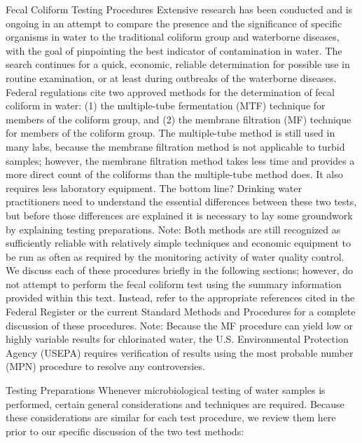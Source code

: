 \documentclass{article}
\begin{document}
Fecal Coliform Testing Procedures Extensive research has been conducted
and is ongoing in an attempt to compare the presence and the
significance of specific organisms in water to the traditional coliform
group and waterborne diseases, with the goal of pinpointing the best
indicator of contamination in water. The search continues for a quick,
economic, reliable determination for possible use in routine
examination, or at least during outbreaks of the waterborne diseases.
Federal regulations cite two approved methods for the determination of
fecal coliform in water: (1) the multiple-tube fermentation (MTF)
technique for members of the coliform group, and (2) the membrane
filtration (MF) technique for members of the coliform group. The
multiple-tube method is still used in many labs, because the membrane
filtration method is not applicable to turbid samples; however, the
membrane filtration method takes less time and provides a more direct
count of the coliforms than the multiple-tube method does. It also
requires less laboratory equipment. The bottom line? Drinking water
practitioners need to understand the essential differences between these
two tests, but before those differences are explained it is necessary to
lay some groundwork by explaining testing preparations. Note: Both
methods are still recognized as sufficiently reliable with relatively
simple techniques and economic equipment to be run as often as required
by the monitoring activity of water quality control. We discuss each of
these procedures briefly in the following sections; however, do not
attempt to perform the fecal coliform test using the summary information
provided within this text. Instead, refer to the appropriate references
cited in the Federal Register or the current Standard Methods and
Procedures for a complete discussion of these procedures. Note: Because
the MF procedure can yield low or highly variable results for
chlorinated water, the U.S. Environmental Protection Agency (USEPA)
requires verification of results using the most probable number (MPN)
procedure to resolve any controversies.

Testing Preparations Whenever microbiological testing of water samples
is performed, certain general considerations and techniques are
required. Because these considerations are similar for each test
procedure, we review them here prior to our specific discussion of the
two test methods:
\end{document}
